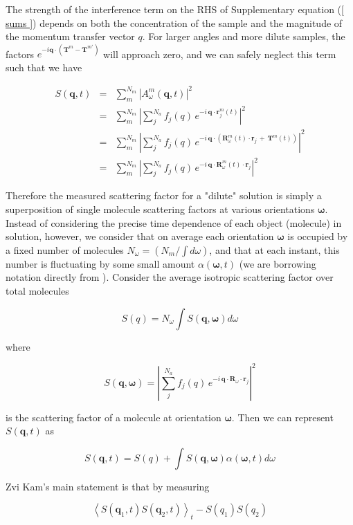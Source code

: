 \documentclass [12pt,fleqn]{article}
\def \be {\begin{equation}}
\def \ee {\end{equation}}
\def \beq {\begin{eqnarray}}
\def \eeq {\end{eqnarray}}
\begin{document}
The strength of the interference term on the RHS of Supplementary equation (\ref{ sums }) depends on both the concentration of the sample and the magnitude of the momentum transfer vector $q$. For larger angles and more dilute samples, the factors $e^{-i \bm q \cdot (  \bm T^m - \bm T^{m'})}$ will approach zero, and we can safely neglect this term such that we have

\beq \label{ scatter}
S( \bm q, t) &=& \sum_m^{N_m} \left | A^m_\omega (\bm q,t ) \right|^2 \\
&=& \sum_m^{N_m} \left | \sum_{j}^{N_a} f_j(q)\, e^ { -i \,\bm q \cdot \bm  r^m _j (t)} \right | ^2   \\
&=& \sum_m^{N_m} \left | \sum_{j}^{N_a} f_j(q)\, e^ { -i \,\bm q \cdot \left (\bm {R}^m_\omega \left(t\right)\cdot \bm r_j \,+\, \bm {T}^m\left(t\right) \right)} \right | ^2 \\
&=& \sum_m^{N_m} \left | \sum_{j}^{N_a} f_j(q)\, e^ { -i \,\bm q \cdot \bm {R}^m_\omega (t)\cdot \bm r_j }  \right | ^2 
\eeq

Therefore the measured scattering factor for a "dilute" solution is simply a superposition of single molecule scattering factors at various orientations $\bm \omega$.  Instead of considering the precise time dependence of each object (molecule) in solution, however, we consider that on average each orientation $\bm \omega$ is occupied by a fixed number of molecules $N_\omega = (N_m/ \int d\omega)$, and that at each instant, this number is fluctuating by some small amount $\alpha( \bm \omega, t )$ (we are borrowing notation directly from \cite{kam1977determination}). Consider the average isotropic scattering factor over total molecules

\be
S(q) = N _\omega \int S( \bm q, \bm \omega ) d\omega 
\ee

where

\be \label{scattering}
 S(\bm  q, \bm \omega )  = \left | \sum_{j}^{N_a} f_j(q)\, e^ { -i \,\bm q \cdot \bm {R}_\omega \cdot \bm r_j } \right | ^2 
\ee

is the scattering factor of a molecule at orientation $\bm \omega$. Then we can represent $S(\bm q, t)$ as 

\be
S(\bm q, t )  = S ( q )  + \int  S( \bm q, \bm \omega ) \alpha( \bm \omega ,t) d\omega 
\ee

Zvi Kam's main statement is that by measuring 

\be 
\left \langle S(\bm q_1, t )  S(\bm q_2, t )   \right \rangle_t - S( q_1 ) S( q_2 )
\ee
\end{document}
